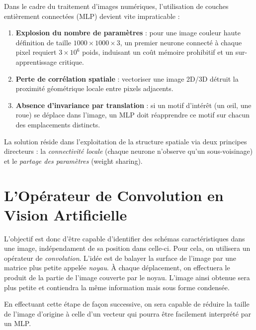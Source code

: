 \minitoc


Dans le cadre du traitement d'images numériques, l'utilisation de couches entièrement connectées (MLP) devient vite impraticable :
\begin{enumerate}
    \item \textbf{Explosion du nombre de paramètres} : pour une image couleur haute définition de taille $1000 \times 1000 \times 3$, un premier neurone connecté à chaque pixel requiert $3 \times 10^6$ poids, induisant un coût mémoire prohibitif et un sur-apprentissage critique.
    \item \textbf{Perte de corrélation spatiale} : vectoriser une image 2D/3D détruit la proximité géométrique locale entre pixels adjacents.
    \item \textbf{Absence d'invariance par translation} : si un motif d'intérêt (un œil, une roue) se déplace dans l'image, un MLP doit réapprendre ce motif sur chacun des emplacements distincts.
\end{enumerate}

La solution réside dans l'exploitation de la structure spatiale via deux principes directeurs : la \emph{connectivité locale} (chaque neurone n'observe qu'un sous-voisinage) et le \emph{partage des paramètres} (weight sharing).


\section{L'Opérateur de Convolution en Vision Artificielle}

L'objectif est donc d'être capable d'identifier des schémas caractéristiques dans une image, indépendament de sa position dans celle-ci. Pour cela, on utilisera un opérateur de \emph{convolution}. L'idée est de balayer la surface de l'image par une matrice plus petite appelée \emph{noyau}. À chaque déplacement, on effectuera le produit de la partie de l'image couverte par le noyau. L'image ainsi obtenue sera plus petite et contiendra la même information mais sous forme condensée. 

En effectuant cette étape de façon successive, on sera capable de réduire la taille de l'image d'origine à celle d'un vecteur qui pourra être facilement interprété par un MLP. 

